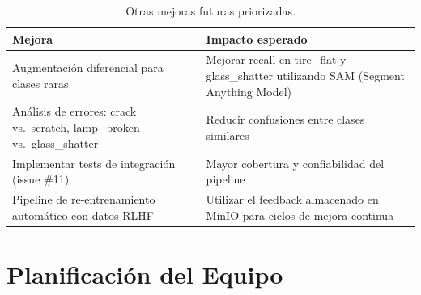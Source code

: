 \documentclass[12pt,a4paper]{article}
\begin{document}
\begin{table}[H]
  \centering
  \renewcommand{\arraystretch}{1.3}
  \begin{tabular}{p{7.5cm} p{5cm}}
    \toprule
    \textbf{Mejora} & \textbf{Impacto esperado} \\
    \midrule
    \rowcolor{rowgray}
    Augmentación diferencial para clases raras &
    Mejorar recall en tire\_flat y glass\_shatter utilizando SAM (Segment Anything Model)\\
    Análisis de errores: crack vs.\ scratch, lamp\_broken vs.\ glass\_shatter &
    Reducir confusiones entre clases similares \\
    \rowcolor{rowgray}
    Implementar tests de integración (issue \#11) &
    Mayor cobertura y confiabilidad del pipeline \\
    Pipeline de re-entrenamiento automático con datos RLHF &
    Utilizar el feedback almacenado en MinIO para ciclos de mejora continua \\
    \bottomrule
  \end{tabular}
  \caption{Otras mejoras futuras priorizadas.}
\end{table}

\section{Planificación del Equipo}
\end{document}
